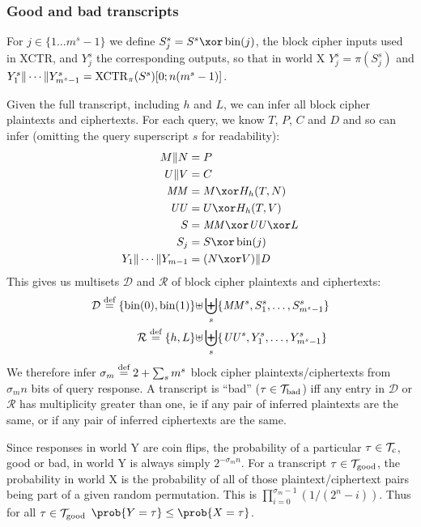 \documentclass[hctr.tex]{subfiles}
\begin{document}
\subsubsection{Good and bad transcripts}
For \(j \in \{1 \ldots m^s-1\}\) we define \(S_j^s = S^s \xor \fromint(j)\),
the block cipher inputs used in XCTR, and \(Y_j^s\) the corresponding
outputs, so that in world X \(Y_j^s = \pi(S_j^s)\) and 
\(Y_1^s \Vert \cdots \Vert Y_{m^s-1}^s = \operatorname{XCTR}_\pi(S^s)[0;n(m^s -1)]\).

Given the full transcript, including \(h\) and \(L\),
we can infer all block cipher plaintexts and ciphertexts.
For each query, we know \(T\), \(P\), \(C\) and \(D\)
and so can infer
(omitting the query superscript \(s\) for readability):
\begin{align*}
    M \Concat N &= P \\
    U \Concat V &= C \\
    \MM &= M \xor H_h(T, N)\\
    \UU &= U \xor H_h(T, V)\\
    S &= \MM \xor \UU \xor L\\ 
    S_j &= S \xor \fromint(j)\\
    Y_1 \Concat \cdots \Concat Y_{m-1} &= (N \xor V) \Concat D \\
\end{align*}
This gives us multisets \(\mathcal{D}\) and \(\mathcal{R}\)
of block cipher plaintexts and ciphertexts:
\begin{align*}
    \mathcal{D} \stackrel{\text{def}}{=} \{\operatorname{bin}(0), \operatorname{bin}(1)\} \uplus &
    \biguplus_s \{\mathit{MM}^s, S_1^s, \ldots, S_{m^s-1}^s\}\\
    \mathcal{R} \stackrel{\text{def}}{=} \{h, L\} \uplus &
    \biguplus_s \{\mathit{UU}^s, Y_1^s, \ldots, Y_{m^s-1}^s\}
\end{align*}
We therefore infer \(\sigma_m \stackrel{\text{def}}{=} 2 + \sum_s m^s\) block cipher
plaintexts/ciphertexts from \(\sigma_m n\) bits of query response.
A transcript is ``bad'' (\(\tau \in \mathcal{T}_\mathrm{bad}\))
iff any entry in \(\mathcal{D}\) or \(\mathcal{R}\)
has multiplicity greater than one,
ie if any pair of inferred plaintexts are the same, or
if any pair of inferred ciphertexts are the same.

Since responses in world Y are coin flips,
the probability of a 
particular \(\tau \in \mathcal{T}_\mathrm{c}\), good or bad,
in world Y is always simply \(2^{-\sigma_m n}\).
For a transcript \(\tau \in \mathcal{T}_\mathrm{good}\),
the probability in world X
is the probability of all of those plaintext/ciphertext
pairs being part of a given random permutation.
This is 
\(\prod_{i=0}^{\sigma_m -1}(1/(2^n - i))\).
Thus for all \(\tau \in \mathcal{T}_\mathrm{good}\)
\(\prob{Y = \tau} \leq \prob{X = \tau}\). 
\end{document}
